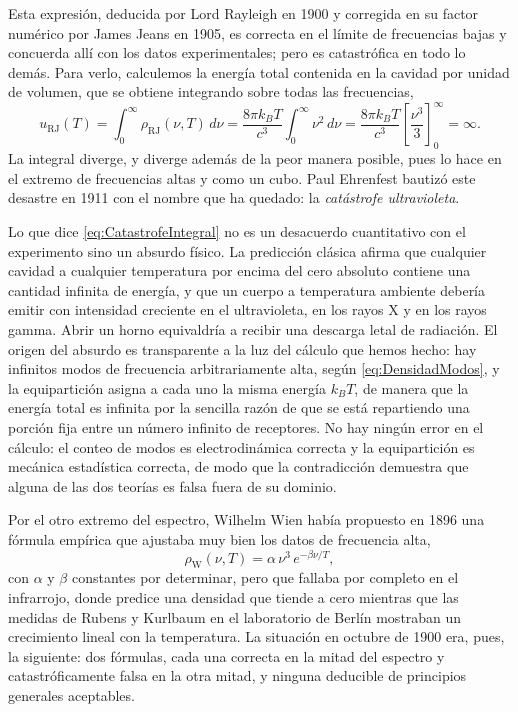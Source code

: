             Esta expresión, deducida por Lord Rayleigh en 1900 y corregida en su factor numérico por James Jeans en 1905, es correcta en el límite de frecuencias bajas y concuerda allí con los datos experimentales; pero es catastrófica en todo lo demás. Para verlo, calculemos la energía total contenida en la cavidad por unidad de volumen, que se obtiene integrando sobre todas las frecuencias,
            \begin{equation}\label{eq:CatastrofeIntegral}
                u_{\text{RJ}}(T) = \int_{0}^{\infty}\rho_{\text{RJ}}(\nu,T)\,d\nu = \frac{8\pi k_{B}T}{c^{3}}\int_{0}^{\infty}\nu^{2}\,d\nu = \frac{8\pi k_{B}T}{c^{3}}\left[\frac{\nu^{3}}{3}\right]_{0}^{\infty} = \infty .
            \end{equation}
            La integral diverge, y diverge además de la peor manera posible, pues lo hace en el extremo de frecuencias altas y como un cubo. Paul Ehrenfest bautizó este desastre en 1911 con el nombre que ha quedado: la \textit{catástrofe ultravioleta}.

            Lo que dice \eqref{eq:CatastrofeIntegral} no es un desacuerdo cuantitativo con el experimento sino un absurdo físico. La predicción clásica afirma que cualquier cavidad a cualquier temperatura por encima del cero absoluto contiene una cantidad infinita de energía, y que un cuerpo a temperatura ambiente debería emitir con intensidad creciente en el ultravioleta, en los rayos X y en los rayos gamma. Abrir un horno equivaldría a recibir una descarga letal de radiación. El origen del absurdo es transparente a la luz del cálculo que hemos hecho: hay infinitos modos de frecuencia arbitrariamente alta, según \eqref{eq:DensidadModos}, y la equipartición asigna a cada uno la misma energía $k_{B}T$, de manera que la energía total es infinita por la sencilla razón de que se está repartiendo una porción fija entre un número infinito de receptores. No hay ningún error en el cálculo: el conteo de modos es electrodinámica correcta y la equipartición es mecánica estadística correcta, de modo que la contradicción demuestra que alguna de las dos teorías es falsa fuera de su dominio.

            Por el otro extremo del espectro, Wilhelm Wien había propuesto en 1896 una fórmula empírica que ajustaba muy bien los datos de frecuencia alta,
            \begin{equation}\label{eq:LeyWien}
                \rho_{\text{W}}(\nu,T) = \alpha\,\nu^{3}\,e^{-\beta\nu/T},
            \end{equation}
            con $\alpha$ y $\beta$ constantes por determinar, pero que fallaba por completo en el infrarrojo, donde predice una densidad que tiende a cero mientras que las medidas de Rubens y Kurlbaum en el laboratorio de Berlín mostraban un crecimiento lineal con la temperatura. La situación en octubre de 1900 era, pues, la siguiente: dos fórmulas, cada una correcta en la mitad del espectro y catastróficamente falsa en la otra mitad, y ninguna deducible de principios generales aceptables.

